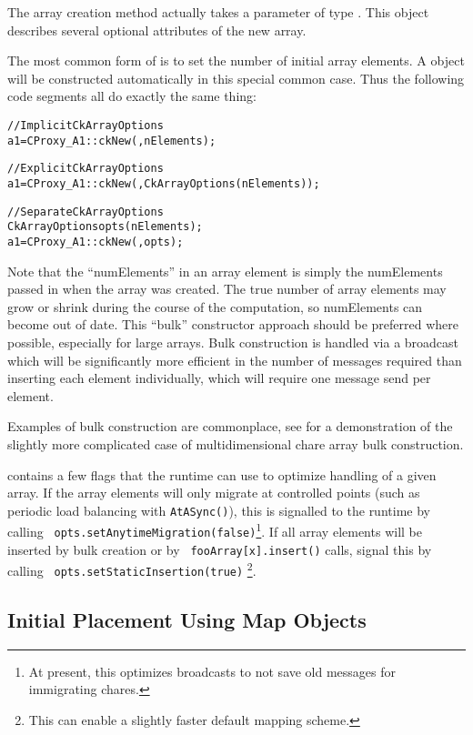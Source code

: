 The array creation method  actually takes a parameter
of type .  This object describes several
optional attributes of the new array.

The most common form of  is to set the number
of initial array elements.  A  object will be 
constructed automatically in this special common case.  Thus
the following code segments all do exactly the same thing:

\begin{alltt}
//Implicit CkArrayOptions
  a1=CProxy_A1::ckNew(,nElements);

//Explicit CkArrayOptions
  a1=CProxy_A1::ckNew(,CkArrayOptions(nElements));

//Separate CkArrayOptions
  CkArrayOptions opts(nElements);
  a1=CProxy_A1::ckNew(,opts);
\end{alltt}


Note that the ``numElements'' in an array element is simply the
numElements passed in when the array was created.  The true number of
array elements may grow or shrink during the course of the
computation, so numElements can become out of date.  This ``bulk''
constructor approach should be preferred where possible, especially
for large arrays.  Bulk construction is handled via a broadcast which
will be significantly more efficient in the number of messages
required than inserting each element individually, which will require
one message send per element.

Examples of bulk construction are commonplace, see
for a demonstration of the slightly more complicated case of
multidimensional chare array bulk construction.

 contains a few flags that the runtime can use to
optimize handling of a given array. If the array elements will only
migrate at controlled points (such as periodic load balancing with
{\tt AtASync()}), this is signalled to the runtime by calling {\tt
  opts.setAnytimeMigration(false)}\footnote{At present, this optimizes
broadcasts to not save old messages for immigrating chares.}. If all
array elements will be inserted by bulk creation or by {\tt
  fooArray[x].insert()} calls, signal this by calling {\tt
  opts.setStaticInsertion(true)} \footnote{This can enable a slightly
  faster default mapping scheme.}.

\subsection{Initial Placement Using Map Objects}
\label{array map}

